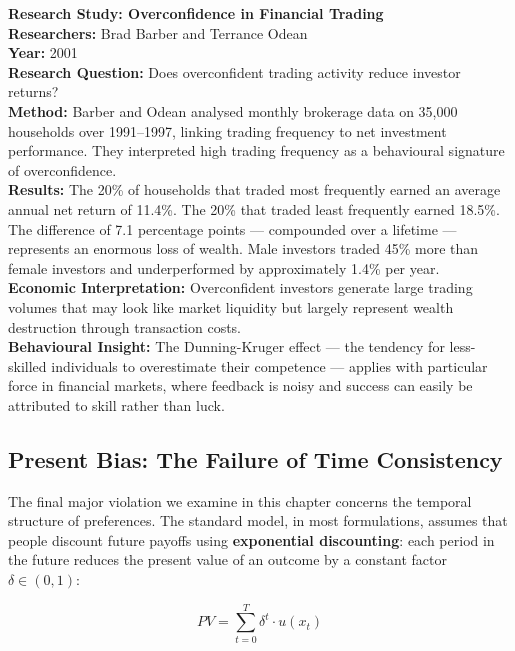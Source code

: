 \documentclass[12pt, letterpaper]{article}
\begin{document}
\begin{researchbox}
\textbf{Research Study: Overconfidence in Financial Trading}\\[4pt]

\textbf{Researchers:} Brad Barber and Terrance Odean\\[4pt]
\textbf{Year:} 2001\\[4pt]
\textbf{Research Question:} Does overconfident trading activity reduce investor returns?\\[4pt]
\textbf{Method:} Barber and Odean analysed monthly brokerage data on 35,000 households over 1991--1997, linking trading frequency to net investment performance. They interpreted high trading frequency as a behavioural signature of overconfidence.\\[4pt]
\textbf{Results:} The 20\% of households that traded most frequently earned an average annual net return of 11.4\%. The 20\% that traded least frequently earned 18.5\%. The difference of 7.1 percentage points --- compounded over a lifetime --- represents an enormous loss of wealth. Male investors traded 45\% more than female investors and underperformed by approximately 1.4\% per year.\\[4pt]
\textbf{Economic Interpretation:} Overconfident investors generate large trading volumes that may look like market liquidity but largely represent wealth destruction through transaction costs.\\[4pt]
\textbf{Behavioural Insight:} The Dunning-Kruger effect --- the tendency for less-skilled individuals to overestimate their competence --- applies with particular force in financial markets, where feedback is noisy and success can easily be attributed to skill rather than luck.\\[4pt]
\end{researchbox}

\medskip


\subsection{Present Bias: The Failure of Time Consistency}


The final major violation we examine in this chapter concerns the temporal structure of preferences. The standard model, in most formulations, assumes that people discount future payoffs using \textbf{exponential discounting}: each period in the future reduces the present value of an outcome by a constant factor $\delta \in (0,1)$:

$$PV = \sum_{t=0}^{T} \delta^t \cdot u(x_t)$$
\end{document}
